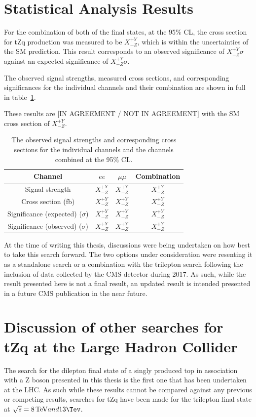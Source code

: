 \section{Statistical Analysis Results}
For the combination of both of the final states, at the 95\% CL, the cross section for tZq production was measured to be $X^{+Y}_{-Z}$, which is within the uncertainties of the SM prediction.
This result corresponds to an observed significance of $X_{-Z}^{+Y} \sigma$ against an expected significance of $X_{-Z}^{+Y} \sigma$.

The observed signal strengths, measured cross sections, and corresponding significances for the individual channels and their combination are shown in full in table~\ref{tab:shapetxs}.

These results are [IN AGREEMENT / NOT IN AGREEMENT] with the SM cross section of  $X^{+Y}_{-Z}$.

\begin{table}[!h]
   \centering
   \caption{The observed signal strengths and corresponding cross sections for
   the individual channels and the channels combined at the 95\% CL.}
   \begin{tabular}{cccc}
       \hline
       Channel & $ee$ & $\mu\mu$ & \textbf{Combination} \\
        \hline
       Signal strength & $X_{-Z}^{+Y}$ & $X_{-Z}^{+Y}$ & $X_{-Z}^{+Y}$ \\
       Cross section (fb) & $X_{-Z}^{+Y}$ & $X_{-Z}^{+Y}$ & $X_{-Z}^{+Y}$ \\
       Significance (expected) ($\sigma$) & $X_{-Z}^{+Y}$ & $X_{-Z}^{+Y}$ & $X_{-Z}^{+Y}$ \\
       Significance (observed) ($\sigma$) & $X_{-Z}^{+Y}$ & $X_{-Z}^{+Y}$ & $X_{-Z}^{+Y}$ \\
    \end{tabular}
   \label{tab:shapetxs}
\end{table}

At the time of writing this thesis, discussions were being undertaken on how best to take this search forward.
The two options under consideration were resenting it as a standalone search or a combination with the trilepton search following the inclusion of data collected by the CMS detector during 2017.
As such, while the result presented here is not a final result, an updated result is intended presented in a future CMS publication in the near future.

\section{Discussion of other searches for tZq at the Large Hadron Collider}
The search for the dilepton final state of a singly produced top in association with a Z boson presented in this thesis is the first one that has been undertaken at the LHC.
As such while these results cannot be compared against any previous or competing results, searches for tZq have been made for the trilepton final state at $\sqrt{s} = 8 \TeV and 13 \Tev$.

